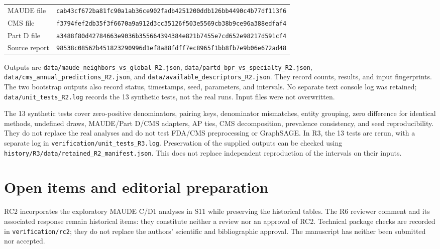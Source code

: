 \documentclass[10pt,a4paper]{article}
\newcommand{\src}[1]{{\small\nolinkurl{#1}}}
\begin{document}
\begin{tabularx}{\linewidth}{@{}lX@{}}
MAUDE file & \src{cab43cf672ba81fc90a1ab36ce902fadb4251200ddb126bb4490c4b77df113f6}\\
CMS file & \src{f3794fef2db35f3f6670a9a912d3cc35126f503e5569cb38b9ce96a388edfaf4}\\
Part D file & \src{a3488f80d42784663e9036b355664394384e821b7455e7cd652e98217d591cf4}\\
Source report & \src{98538c08562b451823290996d1ef8a88fdff7ec8965f1bb8fb7e9b06e672ad48}\\
\end{tabularx}

Outputs are \src{data/maude_neighbors_vs_global_R2.json}, \src{data/partd_bpr_vs_specialty_R2.json}, \src{data/cms_annual_predictions_R2.json}, and \src{data/available_descriptors_R2.json}. They record counts, results, and input fingerprints. The two bootstrap outputs also record status, timestamps, seed, parameters, and intervals. No separate text console log was retained; \src{data/unit_tests_R2.log} records the 13 synthetic tests, not the real runs. Input files were not overwritten.

The 13 synthetic tests cover zero-positive denominators, pairing keys, denominator mismatches, entity grouping, zero difference for identical methods, undefined draws, MAUDE/Part D/CMS adapters, AP ties, CMS decomposition, prevalence consistency, and seed reproducibility. They do not replace the real analyses and do not test FDA/CMS preprocessing or GraphSAGE.
In R3, the 13 tests are rerun, with a separate log in \src{verification/unit_tests_R3.log}. Preservation of the supplied outputs can be checked using \src{history/R3/data/retained_R2_manifest.json}. This does not replace independent reproduction of the intervals on their inputs.



\section{Open items and editorial preparation}
\label{supp:open}
RC2 incorporates the exploratory MAUDE C/D1 analyses in S11 while preserving the historical tables. The R6 reviewer comment and its associated response remain historical items: they constitute neither a review nor an approval of RC2. Technical package checks are recorded in \src{verification/rc2}; they do not replace the authors' scientific and bibliographic approval. The manuscript has neither been submitted nor accepted.
\end{document}
